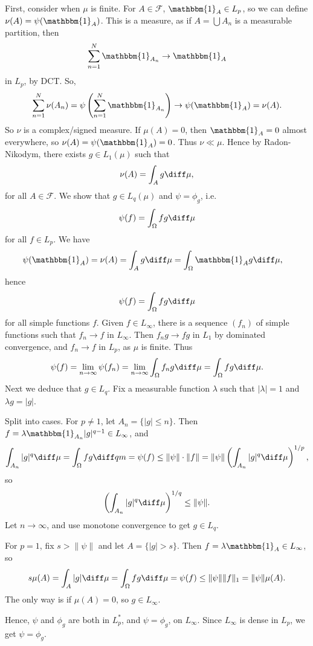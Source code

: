 \documentclass[12pt]{article}
\begin{document}
\begin{proofbox}
	First, consider when $\mu$ is finite. For $A \in \mathcal{F}$, $\mathbbm{1}_{A} \in L_p$, so we can define $\nu(A) = \psi(\mathbbm{1}_{A})$. This is a measure, as if $A = \bigcup A_n$ is a measurable partition, then
	\[
	\sum_{n = 1}^N \mathbbm{1}_{A_n} \to \mathbbm{1}_{A}
	\]
	in $L_p$, by DCT. So,
	\[
	\sum_{n=1}^N \nu(A_n) = \psi \left( \sum_{n=1}^N \mathbbm{1}_{A_n} \right) \to \psi(\mathbbm{1}_{A}) = \nu(A).
	\]
	So $\nu$ is a complex/signed measure. If $\mu(A) = 0$, then $\mathbbm{1}_{A} = 0$ almost everywhere, so $\nu(A) = \psi(\mathbbm{1}_{A}) = 0$. Thus $\nu \ll \mu$. Hence by Radon-Nikodym, there exists $g \in L_1(\mu)$ such that
	\[
	\nu(A) = \int_A g \diff \mu,
	\]
	for all $A \in \mathcal{F}$. We show that $g \in L_q(\mu)$ and $\psi = \phi_g$, i.e.
	\[
	\psi(f) = \int_{\Omega} fg \diff \mu
	\]
	for all $f \in L_p$. We have
	\begin{align*}
		\psi(\mathbbm{1}_{A}) &= \nu(A) = \int_A g \diff \mu = \int_{\Omega} \mathbbm{1}_{A} g \diff \mu,
	\end{align*}
	hence
	\[
	\psi(f) = \int_{\Omega} fg \diff \mu
	\]
	for all simple functions $f$. Given $f \in L_\infty$, there is a sequence $(f_n)$ of simple functions such that $f_n \to f$ in $L_\infty$. Then $f_n g \to f g$ in $L_1$ by dominated convergence, and $f_n \to f$ in $L_p$, as $\mu$ is finite. Thus
	\[
	\psi(f) = \lim_{n \to \infty} \psi(f_n) = \lim_{n \to \infty} \int_{\Omega} f_n g \diff \mu = \int_{\Omega} f g \diff \mu.
	\]
	Next we deduce that $g \in L_q$. Fix a measurable function $\lambda$ such that $|\lambda| = 1$ and $\lambda g = |g|$.

	Split into cases. For $p \neq 1$, let $A_n = \{|g| \leq n\}$. Then $f = \lambda \mathbbm{1}_{A_n} |g|^{q-1} \in L_\infty$, and
	\[
	\int_{A_n} |g|^q \diff \mu = \int_{\Omega} fg \diff qm = \psi(f) \leq \|\psi\| \cdot \|f\| = \|\psi\| \left(\int_{A_n} |g|^q \diff \mu \right)^{1/p},
	\]
	so
	\[
	\left( \int_{A_n} |g|^q \diff \mu \right)^{1/q} \leq \|\psi\|.
	\]
	Let $n \to \infty$, and use monotone convergence to get $g \in L_q$.

	For $p = 1$, fix $s > \|\psi\|$ and let $A = \{|g| > s\}$. Then $f = \lambda \mathbbm{1}_{A} \in L_\infty$, so
	\[
	s \mu(A) = \int_A |g| \diff \mu = \int_{\Omega} 
f g \diff \mu = \psi(f) \leq \|\psi\| \|f\|_1 = \|\psi\| \mu(A).
	\]
	The only way is if $\mu(A) = 0$, so $g \in L_\infty$.

	Hence, $\psi$ and $\phi_g$ are both in $L_p^\ast$, and $\psi = \phi_g$, on $L_\infty$. Since $L_\infty$ is dense in $L_p$, we get $\psi = \phi_g$. 
\end{proofbox}
\end{document}
